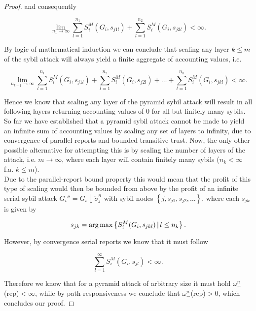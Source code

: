 \begin{proof}
\noindent{}and consequently

\[
\lim\limits_{n_1\rightarrow\infty}\sum\limits_{l=1}^{n_1}S^M_i(G_i,s_{j1l}) + \sum\limits_{l=1}^{n_2}S^M_i(G_i,s_{j2l})<\infty.
\]

\noindent{}By logic of mathematical induction we can conclude that scaling any layer $k\leq{}m$ of the sybil attack will always yield a finite aggregate of accounting values, i.e. 

\[
\lim\limits_{n_{k-1}\rightarrow\infty}\sum\limits_{l=1}^{n_1}S^M_i(G_i,s_{j1l}) + \sum\limits_{l=1}^{n_2}S^M_i(G_i,s_{j2l}) + \ldots + \sum\limits_{l=1}^{n_k}S^M_i(G_i,s_{jkl})<\infty.
\]

\noindent{}Hence we know that scaling any layer of the pyramid sybil attack will result in all following layers returning accounting values of $0$ for all but finitely many sybils.\vspace{1em}\\

\noindent{}So far we have established that a pyramid sybil attack cannot be made to yield an infinite sum of accounting values by scaling any set of layers to infinity, due to convergence of parallel reports and bounded transitive trust. Now, the only other possible alternative for attempting this is by scaling the number of layers of the attack, i.e. $m\rightarrow\infty$, where each layer will contain finitely many sybils ($n_k<\infty$ f.a. $k\leq{}m$). \vspace{1em}\\

\noindent{}Due to the parallel-report bound property this would mean that the profit of this type of scaling would then be bounded from above by the profit of an infinite serial sybil attack $G_i''=G_i\downarrow\tilde{\sigma}_j^n$ with sybil nodes $\left\lbrace{}j,s_{j1}, s_{j2},\ldots \right\rbrace$, where each $s_{jk}$ is given by

\[
s_{jk}=\operatorname*{arg\,max}\left\lbrace{} S^M_i(G_i,s_{jkl})\,|\,l\leq{}n_k\right\rbrace.
\]

\noindent{}However, by convergence serial reports we know that it must follow

\[
\sum\limits_{l=1}^{\infty}S^M_i(G_i,s_{jl})<\infty.
\]

\noindent{}Therefore we know that for a pyramid attack of arbitrary size it must hold $\omega_{+}^n$(rep)$<\infty$, while by path-responsiveness we conclude that $\omega_{-}^n$(rep)$>0$, which concludes our proof.
\end{proof}

